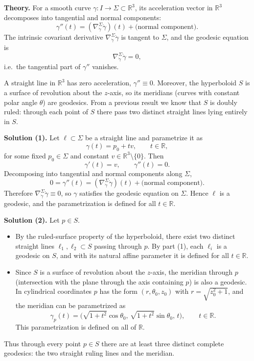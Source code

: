 \documentclass[12pt,a4paper]{article}
\theoremstyle{plain}
\theoremstyle{definition}      %
\begin{document}
	\medskip
	\textbf{Theory.}
	For a smooth curve $\gamma:I\to\Sigma\subset\mathbb R^3$, its acceleration
	vector in $\mathbb R^3$ decomposes into tangential and normal components:
	\[
	\gamma''(t) = (\nabla^{\Sigma}_{\dot\gamma}\dot\gamma)(t) + \text{(normal component)}.
	\]
	The intrinsic covariant derivative $\nabla^{\Sigma}_{\dot\gamma}\dot\gamma$
	is tangent to $\Sigma$, and the geodesic equation is
	\[
	\nabla^{\Sigma}_{\dot\gamma}\dot\gamma=0,
	\]
	i.e.\ the tangential part of $\gamma''$ vanishes.
	
	A straight line in $\mathbb R^3$ has zero acceleration, $\gamma''\equiv0$.
	Moreover, the hyperboloid $S$ is a surface of revolution about the $z$-axis, so
	its meridians (curves with constant polar angle $\theta$) are geodesics.
	From a previous result we know that $S$ is doubly ruled: through each point of
	$S$ there pass two distinct straight lines lying entirely in $S$.
	
	\medskip
	\textbf{Solution (1).}
	Let $\ell\subset\Sigma$ be a straight line and parametrize it as
	\[
	\gamma(t) = p_0 + t v,\qquad t\in\mathbb R,
	\]
	for some fixed $p_0\in\Sigma$ and constant $v\in\mathbb R^3\setminus\{0\}$.
	Then
	\[
	\gamma'(t)=v,\qquad \gamma''(t)=0.
	\]
	Decomposing into tangential and normal components along $\Sigma$,
	\[
	0 = \gamma''(t) = (\nabla^{\Sigma}_{\dot\gamma}\dot\gamma)(t)
	+ \text{(normal component)}.
	\]
	Therefore $\nabla^{\Sigma}_{\dot\gamma}\dot\gamma\equiv0$, so $\gamma$ satisfies
	the geodesic equation on $\Sigma$. Hence $\ell$ is a geodesic, and the
	parametrization is defined for all $t\in\mathbb R$.
	
	\medskip
	\textbf{Solution (2).}
	Let $p\in S$.
	\begin{itemize}
		\item By the ruled-surface property of the hyperboloid, there exist two
		distinct straight lines $\ell_1,\ell_2\subset S$ passing through $p$.
		By part (1), each $\ell_i$ is a geodesic on $S$, and with its natural
		affine parameter it is defined for all $t\in\mathbb R$.
		\item Since $S$ is a surface of revolution about the $z$-axis, the meridian
		through $p$ (intersection with the plane through the axis containing
		$p$) is also a geodesic. In cylindrical coordinates $p$ has the form
		$(r,\theta_0,z_0)$ with $r=\sqrt{z_0^2+1}$, and the meridian can be
		parametrized as
		\[
		\gamma_p(t) = \bigl(\sqrt{1+t^2}\cos\theta_0,\,
		\sqrt{1+t^2}\sin\theta_0,\,
		t\bigr),\qquad t\in\mathbb R.
		\]
		This parametrization is defined on all of $\mathbb R$.
	\end{itemize}
	Thus through every point $p\in S$ there are at least three distinct complete
	geodesics: the two straight ruling lines and the meridian.
	
\end{document}
